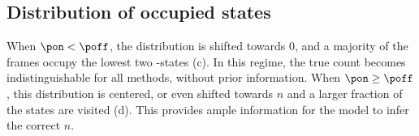 
\subsection{Distribution of occupied states} \label{occupied_states}
When $\pon < \poff$, the distribution is shifted towards 0, and a majority 
	of the frames occupy the lowest two \z{}-states (c). 
	In this regime, the true count becomes indistinguishable for all methods, without prior information. 
	When $\pon \geq \poff$, this distribution is centered, or even shifted towards $n$ 
	and a larger fraction of the states are visited (d). 
	This provides ample information for the model to infer the correct $n$.

